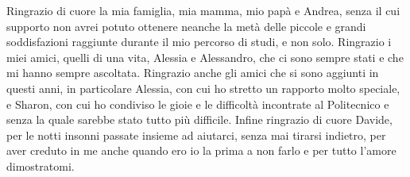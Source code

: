\documentclass[11pt,a4paper]{article}
\begin{document}
Ringrazio di cuore la mia famiglia, mia mamma, mio papà e Andrea, senza il cui supporto non avrei potuto ottenere neanche la metà delle piccole e grandi soddisfazioni raggiunte durante il mio percorso di studi, e non solo. 
Ringrazio i miei amici, quelli di una vita, Alessia e Alessandro, che ci sono sempre stati e che mi hanno sempre ascoltata. Ringrazio anche gli amici che si sono aggiunti in questi anni, in particolare Alessia, con cui ho stretto un rapporto molto speciale, e Sharon, con cui ho condiviso le gioie e le difficoltà incontrate al Politecnico e senza la quale sarebbe stato tutto più difficile. 
Infine ringrazio di cuore Davide, per le notti insonni passate insieme ad aiutarci, senza mai tirarsi indietro, per aver creduto in me anche quando ero io la prima a non farlo e per tutto l'amore dimostratomi. 


\end{document}
